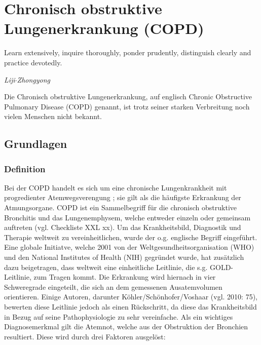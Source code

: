 \ifpdf
    \graphicspath{{2_chronisch_obstruktive_lungenerkrankung/figures/PNG/}{2_chronisch_obstruktive_lungenerkrankung/figures/PDF/}{2_chronisch_obstruktive_lungenerkrankung/figures/}}
\else
    \graphicspath{{2_chronisch_obstruktive_lungenerkrankung/figures/EPS/}{2_chronisch_obstruktive_lungenerkrankung/figures/}}
\fi

\chapter{Chronisch obstruktive Lungenerkrankung (COPD)}
\label{copd}
\setlength{\epigraphwidth}{6.0cm}
\epigraph{Learn extensively, inquire thoroughly, ponder prudently, distinguish clearly and practice devotedly.}{\emph{Liji$\cdot$Zhongyong}}



Die Chronisch obstruktive Lungenerkrankung, auf englisch Chronic Obstructive Pulmonary Disease (COPD) genannt, ist trotz seiner starken Verbreitung noch vielen Menschen nicht bekannt.

\section{Grundlagen} %
\label{grundlagen}

\subsection{Definition}
\label{definition}
Bei der COPD handelt es sich um eine chronische Lungenkrankheit mit progredienter Atemwegsverengung ; sie gilt als die häufigste Erkrankung der Atmungsorgane. COPD ist ein Sammelbegriff für die chronisch obstruktive Bronchitis und das Lungenemphysem, welche entweder einzeln oder gemeinsam auftreten (vgl. Checkliste XXL xx). Um das Krankheitsbild, Diagnostik und Therapie weltweit zu vereinheitlichen, wurde der o.g. englische Begriff eingeführt. Eine globale Initiatve, welche 2001 von der Weltgesundheitsorganisation (WHO) und den National Institutes of Health (NIH) gegründet wurde, hat zusätzlich dazu beigetragen, dass weltweit eine einheitliche Leitlinie, die s.g. GOLD-Leitlinie, zum Tragen kommt. Die Erkrankung wird hiernach in vier Schweregrade eingeteilt, die sich an dem gemessenen Ausatemvolumen orientieren. Einige Autoren, darunter Köhler/Schönhofer/Voshaar (vgl. 2010: 75), bewerten diese Leitlinie jedoch als einen Rückschritt, da diese das Krankheitsbild in Bezug auf seine Pathophysiologie zu sehr vereinfache.
Als ein wichtiges Diagnosemerkmal gilt die Atemnot, welche aus der Obstruktion der Bronchien resultiert. Diese wird durch drei Faktoren ausgelöst: 

